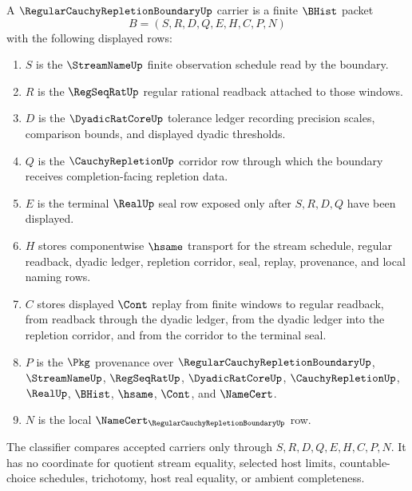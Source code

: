\begin{definition}
\label{def:regular-cauchy-repletion-boundary-carrier}
A $\RegularCauchyRepletionBoundaryUp$ carrier is a finite $\BHist$ packet
$$
B=(S,R,D,Q,E,H,C,P,N)
$$
with the following displayed rows:
\begin{enumerate}
\item $S$ is the $\StreamNameUp$ finite observation schedule read by the boundary.
\item $R$ is the $\RegSeqRatUp$ regular rational readback attached to those windows.
\item $D$ is the $\DyadicRatCoreUp$ tolerance ledger recording precision scales, comparison bounds, and displayed dyadic thresholds.
\item $Q$ is the $\CauchyRepletionUp$ corridor row through which the boundary receives completion-facing repletion data.
\item $E$ is the terminal $\RealUp$ seal row exposed only after $S,R,D,Q$ have been displayed.
\item $H$ stores componentwise $\hsame$ transport for the stream schedule, regular readback, dyadic ledger, repletion corridor, seal, replay, provenance, and local naming rows.
\item $C$ stores displayed $\Cont$ replay from finite windows to regular readback, from readback through the dyadic ledger, from the dyadic ledger into the repletion corridor, and from the corridor to the terminal seal.
\item $P$ is the $\Pkg$ provenance over $\RegularCauchyRepletionBoundaryUp$, $\StreamNameUp$, $\RegSeqRatUp$, $\DyadicRatCoreUp$, $\CauchyRepletionUp$, $\RealUp$, $\BHist$, $\hsame$, $\Cont$, and $\NameCert$.
\item $N$ is the local $\NameCert_{\RegularCauchyRepletionBoundaryUp}$ row.
\end{enumerate}
The classifier compares accepted carriers only through $S,R,D,Q,E,H,C,P,N$. It has no coordinate for quotient stream equality, selected host limits, countable-choice schedules, trichotomy, host real equality, or ambient completeness.
\end{definition}

